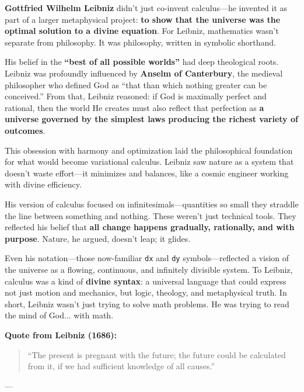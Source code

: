 \begin{tcolorbox}[colback=blue!5!white, colframe=blue!50!black, 
  title={Historical Sidebar: Leibniz—Calculus, Harmony, and the Divine Algorithm}]
  
      \textbf{Gottfried Wilhelm Leibniz} didn’t just co-invent calculus—he invented it as part of a larger metaphysical project: \textbf{to show that the universe was the optimal solution to a divine equation}. For Leibniz, mathematics wasn’t separate from philosophy. It was philosophy, written in symbolic shorthand.
  
      \medskip
  
      His belief in the \textbf{“best of all possible worlds”} had deep theological roots. Leibniz was profoundly influenced by \textbf{Anselm of Canterbury}, the medieval philosopher who defined God as “that than which nothing greater can be conceived.” From that, Leibniz reasoned: if God is maximally perfect and rational, then the world He creates must also reflect that perfection as \textbf{a universe governed by the simplest laws producing the richest variety of outcomes}.
  
      \medskip
  
      This obsession with harmony and optimization laid the philosophical foundation for what would become variational calculus. Leibniz saw nature as a system that doesn’t waste effort—it minimizes and balances, like a cosmic engineer working with divine efficiency.
  
      \medskip
  
      His version of calculus focused on infinitesimals—quantities so small they straddle the line between something and nothing. These weren’t just technical tools. They reflected his belief that \textbf{all change happens gradually, rationally, and with purpose}. Nature, he argued, doesn’t leap; it glides.
  
      \medskip
  
      Even his notation—those now-familiar \texttt{dx} and \texttt{dy} symbols—reflected a vision of the universe as a flowing, continuous, and infinitely divisible system. To Leibniz, calculus was a kind of \textbf{divine syntax}: a universal language that could express not just motion and mechanics, but logic, theology, and metaphysical truth. In short, Leibniz wasn’t just trying to solve math problems. He was trying to read the mind of God... with math.
  
      \medskip
  
      \textbf{Quote from Leibniz (1686):}
      \begin{quote}
      “The present is pregnant with the future; the future could be calculated from it, if we had sufficient knowledge of all causes.”
      \end{quote}
  
  
  \end{tcolorbox}
  







---
